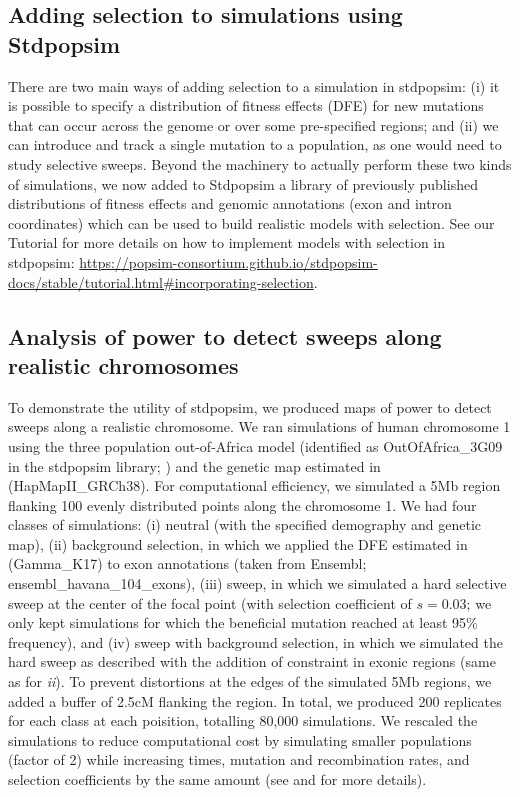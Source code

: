 \subsection{Adding selection to simulations using Stdpopsim}

There are two main ways of adding selection to a simulation in stdpopsim: (i) it is possible to specify a distribution of fitness effects (DFE) for new mutations that can occur across the genome or over some pre-specified regions; and (ii) we can introduce and track a single mutation to a population, as one would need to study selective sweeps.
Beyond the machinery to actually perform these two kinds of simulations, we now added to Stdpopsim a library of previously published distributions of fitness effects and genomic annotations (\eg exon and intron coordinates) which can be used to build realistic models with selection.
See our Tutorial for more details on how to implement models with selection in stdpopsim: \url{https://popsim-consortium.github.io/stdpopsim-docs/stable/tutorial.html#incorporating-selection}.

\subsection{Analysis of power to detect sweeps along realistic chromosomes}

To demonstrate the utility of stdpopsim, we produced maps of power to detect sweeps along a realistic chromosome.
We ran simulations of human chromosome 1 using the three population out-of-Africa model (identified as OutOfAfrica\_3G09 in the stdpopsim library; \cite{gutenkunst_inferring_2009}) and the genetic map estimated in \citet{frazer_second_2007} (HapMapII\_GRCh38).
For computational efficiency, we simulated a 5Mb region flanking 100 evenly distributed points along the chromosome 1.
We had four classes of simulations: (i) neutral (with the specified demography and genetic map), (ii) background selection, in which we applied the DFE estimated in \citet{kim_inference_2017} (Gamma\_K17) to exon annotations (taken from Ensembl; ensembl\_havana\_104\_exons), (iii) sweep, in which we simulated a hard selective sweep at the center of the focal point (with selection coefficient of $s=0.03$; we only kept simulations for which the beneficial mutation reached at least 95\% frequency), and (iv) sweep with background selection, in which we simulated the hard sweep as described with the addition of constraint in exonic regions (same as for \emph{ii}).
To prevent distortions at the edges of the simulated 5Mb regions, we added a buffer of 2.5cM flanking the region.
In total, we produced 200 replicates for each class at each poisition, totalling 80,000 simulations.
We rescaled the simulations to reduce computational cost by simulating smaller populations (factor of 2) while increasing times, mutation and recombination rates, and selection coefficients by the same amount (see \cite{uricchio_robust_2014} and \cite{adrion_community-maintained_2020} for more details).
